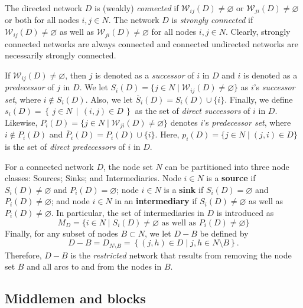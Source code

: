 The directed network $D$ is (weakly) \emph{connected} if $\mathcal{W}_{ij}(D) \neq \varnothing$ or $\mathcal{W}_{ji}(D) \neq \varnothing$ or both for all nodes $i,j \in N$. The network $D$ is \emph{strongly connected} if $\mathcal{W}_{ij}(D) \neq \varnothing$ as well as $\mathcal{W}_{ji}(D) \neq \varnothing$ for all nodes $i,j \in N$. Clearly, strongly connected networks are always connected and connected undirected networks are necessarily strongly connected.

If $\mathcal{W}_{ij} (D) \neq \varnothing$, then $j$ is denoted as a \textit{successor} of $i$ in $D$ and $i$ is denoted as a \textit{predecessor} of $j$ in $D$. We let $S_{i}(D)= \{j \in N \mid \mathcal{W}_{ij}(D) \neq \varnothing \}$ as $i$'s \textit{successor set}, where $i \notin S_{i}(D)$. Also, we let $\overline{S}_{i}(D) = S_{i}(D) \cup \{i\}$. Finally, we define $s_{i}(D) = \left\{\, j \in N \,\middle|\, (i,j) \in D \,\right\}$ as the set of \textit{direct successors} of $i$ in $D$. Likewise, $P_{i}(D)=\{j \in N \mid \mathcal{W}_{ji}(D) \neq \varnothing \}$ denotes $i$'s \textit{predecessor set}, where $i \notin P_{i}(D)$ and $\overline{P}_{i}(D) = P_{i}(D) \cup \{i\}$. Here, $p_{i}(D)=\{j \in N \mid (j,i) \in D\}$ is the set of \textit{direct predecessors} of $i$ in $D$.

For a connected network $D$, the node set $N$ can be partitioned into three node classes: Sources; Sinks; and Intermediaries. Node $i \in N$ is a \textbf{source} if $S_{i}(D) \neq \varnothing$ and $P_{i}(D) = \varnothing$; node $i \in N$ is a \textbf{sink} if $S_{i}(D) = \varnothing$ and $P_{i}(D) \neq \varnothing$; and node $i \in N$ in an \textbf{intermediary} if $S_{i}(D) \neq \varnothing$ as well as $P_{i}(D) \neq \varnothing$. In particular, the set of intermediaries in $D$ is introduced as
\begin{equation}
M_D = \{ i \in N \mid S_{i}(D) \neq \varnothing \mbox{ as well as } P_{i}(D) \neq \varnothing \}
\end{equation}
Finally, for any subset of nodes $B \subset N$, we let $D-B$ be defined by
\begin{equation}
D - B = D_{N \setminus B} = \left\{ (j,h) \in D \mid j,h \in N \setminus B \right\} .
\end{equation}
Therefore, $D - B$ is the \emph{restricted} network that results from removing the node set $B$ and all arcs to and from the nodes in $B$.

\subsection{Middlemen and blocks}

